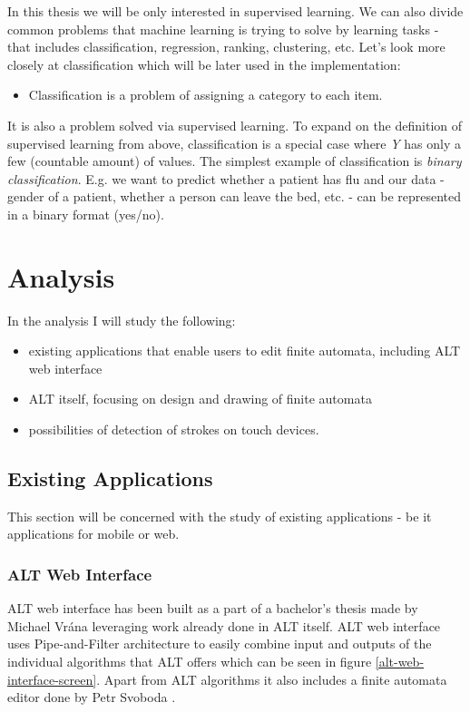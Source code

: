 In this thesis we will be only interested in supervised learning. We can also divide common problems that machine learning is trying to solve by learning tasks - that includes classification, regression, ranking, clustering, etc. Let's look more closely at classification which will be later used in the implementation:
\begin{itemize}
    \item Classification is a problem of assigning a category to each item.
\end{itemize}
It is also a problem solved via supervised learning. To expand on the definition of supervised learning from above, classification is a special case where \textit{Y} has only a few (countable amount) of values. The simplest example of classification is \textit{binary classification}. E.g. we want to predict whether a patient has flu and our data - gender of a patient, whether a person can leave the bed, etc. - can be represented in a binary format (yes/no).

\chapter{Analysis}
\label{chap:analysis}

In the analysis I will study the following:
\begin{itemize}
    \item existing applications that enable users to edit finite automata, including ALT web interface
    \item ALT itself, focusing on design and drawing of finite automata
    \item possibilities of detection of strokes on touch devices.
\end{itemize}

\section{Existing Applications}

This section will be concerned with the study of existing applications - be it applications for mobile or web.

\subsection{ALT Web Interface}

ALT web interface has been built as a part of a bachelor's thesis made by Michael Vrána \cite{web-alt} leveraging work already done in ALT itself. ALT web interface uses Pipe-and-Filter \cite{pipe-and-filter} architecture to easily combine input and outputs of the individual algorithms that ALT offers which can be seen in figure \ref{alt-web-interface-screen}. Apart from ALT algorithms it also includes a finite automata editor done by Petr Svoboda \cite{state-maker}.

